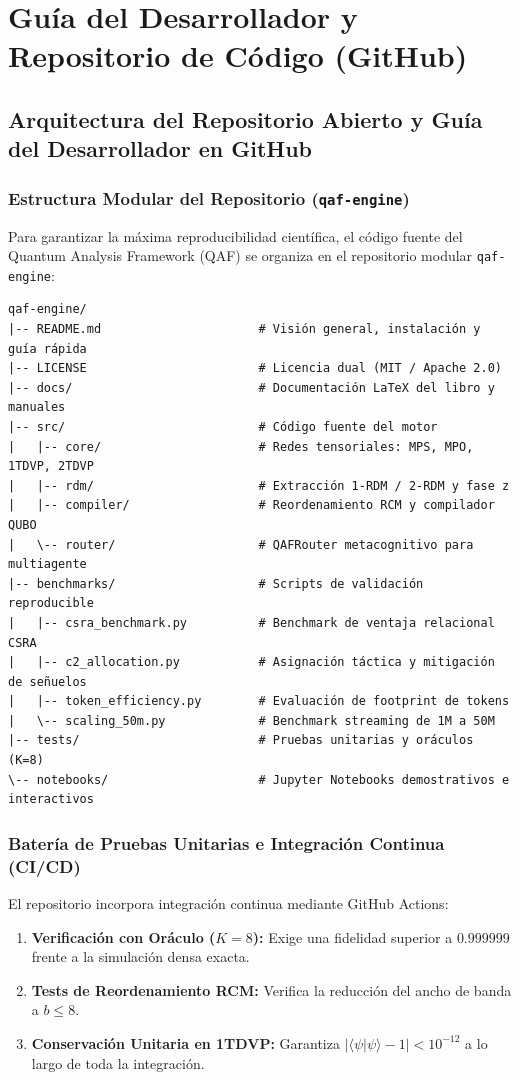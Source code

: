 \documentclass[11pt,a4paper,oneside]{report}
\begin{document}
\part{Guía del Desarrollador y Repositorio de Código (GitHub)}

\chapter{Arquitectura del Repositorio Abierto y Guía del Desarrollador en GitHub}
\label{cap:github_desarrollador}

\section{Estructura Modular del Repositorio (\texttt{qaf-engine})}
Para garantizar la máxima reproducibilidad científica, el código fuente del Quantum Analysis Framework (QAF) se organiza en el repositorio modular \texttt{qaf-engine}:

\begin{verbatim}
qaf-engine/
|-- README.md                      # Visión general, instalación y guía rápida
|-- LICENSE                        # Licencia dual (MIT / Apache 2.0)
|-- docs/                          # Documentación LaTeX del libro y manuales
|-- src/                           # Código fuente del motor
|   |-- core/                      # Redes tensoriales: MPS, MPO, 1TDVP, 2TDVP
|   |-- rdm/                       # Extracción 1-RDM / 2-RDM y fase z
|   |-- compiler/                  # Reordenamiento RCM y compilador QUBO
|   \-- router/                    # QAFRouter metacognitivo para multiagente
|-- benchmarks/                    # Scripts de validación reproducible
|   |-- csra_benchmark.py          # Benchmark de ventaja relacional CSRA
|   |-- c2_allocation.py           # Asignación táctica y mitigación de señuelos
|   |-- token_efficiency.py        # Evaluación de footprint de tokens
|   \-- scaling_50m.py             # Benchmark streaming de 1M a 50M
|-- tests/                         # Pruebas unitarias y oráculos (K=8)
\-- notebooks/                     # Jupyter Notebooks demostrativos e interactivos
\end{verbatim}

\section{Batería de Pruebas Unitarias e Integración Continua (CI/CD)}
El repositorio incorpora integración continua mediante GitHub Actions:
\begin{enumerate}
    \item \textbf{Verificación con Oráculo ($K=8$):} Exige una fidelidad superior a $0.999999$ frente a la simulación densa exacta.
    \item \textbf{Tests de Reordenamiento RCM:} Verifica la reducción del ancho de banda a $b \le 8$.
    \item \textbf{Conservación Unitaria en 1TDVP:} Garantiza $|\langle\psi|\psi\rangle - 1| < 10^{-12}$ a lo largo de toda la integración.
\end{enumerate}
\end{document}
